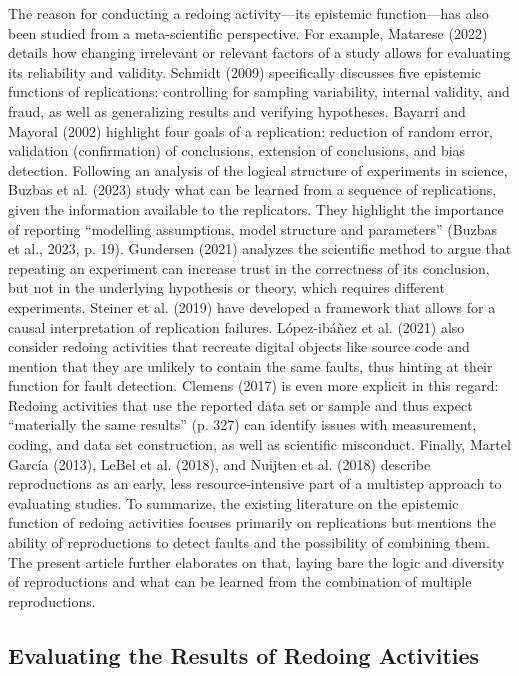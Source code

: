 \documentclass[authordate, empirical]{jote-new-article}
\begin{document}
	The reason for conducting a redoing activity—its epistemic function—has also been studied from a meta-scientific perspective. For example, Matarese (2022) details how changing irrelevant or relevant factors of a study allows for evaluating its reliability and validity. Schmidt (2009) specifically discusses five epistemic functions of replications: controlling for sampling variability, internal validity, and fraud, as well as generalizing results and verifying hypotheses. Bayarri and Mayoral (2002) highlight four goals of a replication: reduction of random error, validation (confirmation) of conclusions, extension of conclusions, and bias detection. Following an analysis of the logical structure of experiments in science, Buzbas et al. (2023) study what can be learned from a sequence of replications, given the information available to the replicators. They highlight the importance of reporting “modelling assumptions, model structure and parameters” (Buzbas et al., 2023, p. 19). Gundersen (2021) analyzes the scientific method to argue that repeating an experiment can increase trust in the correctness of its conclusion, but not in the underlying hypothesis or theory, which requires different experiments. Steiner et al. (2019) have developed a framework that allows for a causal interpretation of replication failures. López-ibáñez et al. (2021) also consider redoing activities that recreate digital objects like source code and mention that they are unlikely to contain the same faults, thus hinting at their function for fault detection. Clemens (2017) is even more explicit in this regard: Redoing activities that use the reported data set or sample and thus expect “materially the same results” (p. 327) can identify issues with measurement, coding, and data set construction, as well as scientific misconduct. Finally, Martel García (2013), LeBel et al. (2018), and Nuijten et al. (2018) describe reproductions as an early, less resource-intensive part of a multistep approach to evaluating studies. To summarize, the existing literature on the epistemic function of redoing activities focuses primarily on replications but mentions the ability of reproductions to detect faults and the possibility of combining them. The present article further elaborates on that, laying bare the logic and diversity of reproductions and what can be learned from the combination of multiple reproductions.



	\subsection{Evaluating the Results of Redoing Activities}
\end{document}
